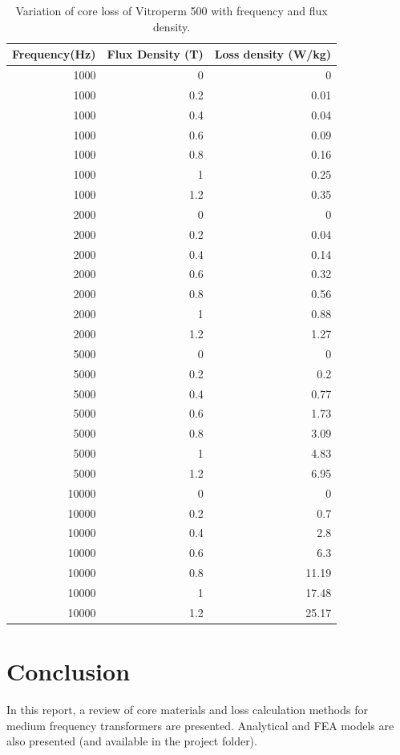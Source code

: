 \documentclass[a4paper, 11pt]{article} %
\begin{document}
\begin{table}[]
\begin{center}
\begin{tabular}{rrr}
Frequency(Hz) & Flux Density (T) & Loss density (W/kg) \\
\hline
1000 & 0 & 0 \\
1000 & 0.2 & 0.01 \\
1000 & 0.4 & 0.04 \\
1000 & 0.6 & 0.09 \\
1000 & 0.8 & 0.16 \\
1000 & 1 & 0.25 \\
1000 & 1.2 & 0.35 \\
\hline
2000 & 0 & 0 \\
2000 & 0.2 & 0.04 \\
2000 & 0.4 & 0.14 \\
2000 & 0.6 & 0.32 \\
2000 & 0.8 & 0.56 \\
2000 & 1 & 0.88 \\
2000 & 1.2 & 1.27 \\
\hline
5000 & 0 & 0 \\
5000 & 0.2 & 0.2 \\
5000 & 0.4 & 0.77 \\
5000 & 0.6 & 1.73 \\
5000 & 0.8 & 3.09 \\
5000 & 1 & 4.83 \\
5000 & 1.2 & 6.95 \\
\hline
10000 & 0 & 0 \\
10000 & 0.2 & 0.7 \\
10000 & 0.4 & 2.8 \\
10000 & 0.6 & 6.3 \\
10000 & 0.8 & 11.19 \\
10000 & 1 & 17.48 \\
10000 & 1.2 & 25.17 \\
\hline
\end{tabular} 
\end{center}
\caption{Variation of core loss of Vitroperm 500 with frequency and flux density.}
\label{core_loss_vs_freq_B}
\end{table}

\section{Conclusion}

In this report, a review of core materials and loss calculation methods for medium frequency transformers are presented. Analytical and FEA models are also presented (and available in the project folder).
\end{document}
